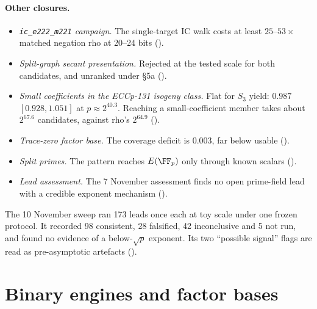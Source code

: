 \paragraph{Other closures.}
\begin{itemize}
\item \emph{\texttt{ic\_e222\_m221} campaign.} The single-target IC walk costs
  at least $25$--$53\times$ matched negation rho at 20--24 bits
  ().
\item \emph{Split-graph secant presentation.} Rejected at the tested scale for
  both candidates, and unranked under \S5a
  ().
\item \emph{Small coefficients in the ECCp-131 isogeny class.} Flat for
  $S_3$ yield: $0.987$ $[0.928,1.051]$ at $p\approx2^{40.3}$. Reaching a
  small-coefficient member takes about $2^{67.6}$ candidates, against
  rho's $2^{64.9}$ ().
\item \emph{Trace-zero factor base.} The coverage deficit is $0.003$, far
  below usable ().
\item \emph{Split primes.} The pattern reaches $E(\FF_p)$ only through known
  scalars ().
\item \emph{Lead assessment.} The 7 November assessment finds no open
  prime-field lead with a credible exponent mechanism
  ().
\end{itemize}
The 10 November sweep ran 173 leads once each at toy scale under one frozen
protocol. It recorded 98 consistent, 28 falsified, 42 inconclusive and 5
not run, and found no evidence of a below-$\sqrt p$ exponent. Its two
``possible signal'' flags are read as pre-asymptotic artefacts
().

\section{Binary engines and factor bases}\label{sec:nov-binary}

